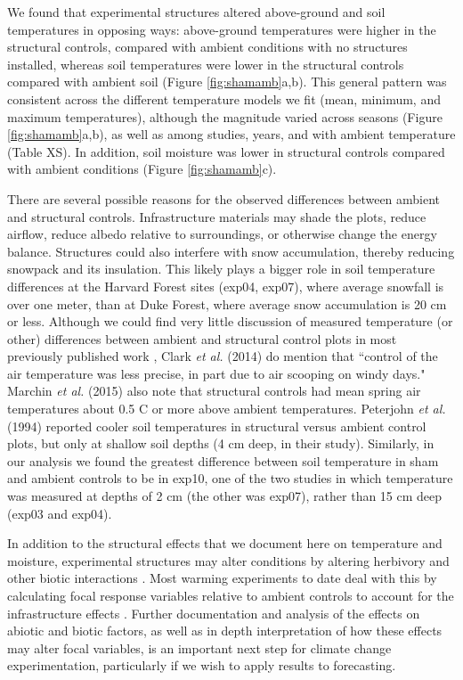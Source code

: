 \documentclass{article}
\begin{document}
\par We found that experimental structures altered above-ground and soil temperatures in opposing ways: above-ground temperatures were higher in the structural controls, compared with ambient conditions with no structures installed, whereas soil temperatures were lower in the structural controls compared with ambient soil (Figure \ref{fig:shamamb}a,b). This general pattern was consistent across the different temperature models we fit (mean, minimum, and maximum temperatures), although the magnitude varied across seasons (Figure \ref{fig:shamamb}a,b), as well as among studies, years, and with ambient temperature (Table XS). In addition, soil moisture was lower in structural controls compared with ambient conditions (Figure \ref{fig:shamamb}c). 
\par There are several possible reasons for the observed differences between ambient and structural controls. Infrastructure materials may shade the plots, reduce airflow, reduce albedo relative to surroundings, or otherwise change the energy balance. Structures could also interfere with snow accumulation, thereby reducing snowpack and its insulation. This likely plays a bigger role in soil temperature differences at the Harvard Forest sites (exp04, exp07), where average snowfall is over one meter, than at Duke Forest, where average snow accumulation is 20 cm or less. Although we could find very little discussion of measured temperature (or other) differences between ambient and structural control plots in most previously published work \citep[e.g.,][]{farnsworth1995,pelini2011,clark2014a,clark2014b}, Clark \textit{et al.} (2014) do mention that ``control of the air temperature was less precise, in part due to air scooping on windy days." Marchin \textit{et al.} (2015) also note that structural controls had mean spring air temperatures about 0.5 \degree C or more above ambient temperatures. Peterjohn \textit{et al.} (1994) reported cooler soil temperatures in structural versus ambient control plots, but only at shallow soil depths (4 cm deep, in their study). Similarly, in our analysis we found the greatest difference between soil temperature in sham and ambient controls to be in exp10, one of the two studies in which temperature was measured at depths of 2 cm (the other was exp07), rather than 15 cm deep (exp03 and exp04). 
\par In addition to the structural effects that we document here on temperature and moisture, experimental structures may alter conditions by altering herbivory and other biotic interactions \citep{kennedy1995,moise2010,wolkovich2012,hoeppner2012}. Most warming experiments to date deal with this by calculating focal response variables relative to ambient controls to account for the infrastructure effects \citep [e.g.,][]{marchin2015}. Further documentation and analysis of the effects on abiotic and biotic factors, as well as in depth interpretation of how these effects may alter focal variables, is an important next step for climate change experimentation, particularly if we wish to apply results to forecasting.
\end{document}
